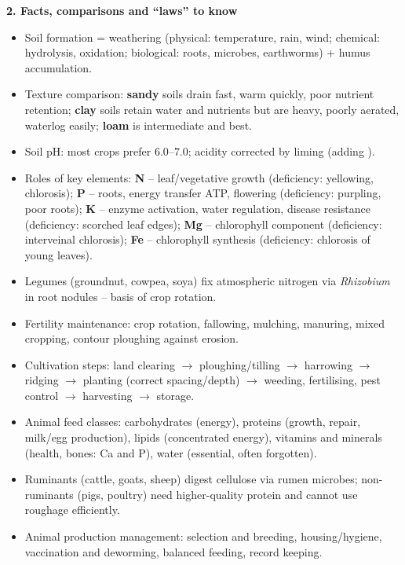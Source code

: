 \documentclass[11pt]{article}
\newcommand{\cle}[1]{{\popxbold\color{popdark}#1}}
\begin{document}
\begin{bilan}
\textbf{2. Facts, comparisons and ``laws'' to know}
\begin{itemize}
\item Soil formation = \cle{weathering} (physical: temperature, rain, wind; chemical: hydrolysis, oxidation; biological: roots, microbes, earthworms) + humus accumulation.
\item Texture comparison: \textbf{sandy} soils drain fast, warm quickly, poor nutrient retention; \textbf{clay} soils retain water and nutrients but are heavy, poorly aerated, waterlog easily; \textbf{loam} is intermediate and best.
\item Soil pH: most crops prefer $6.0$--$7.0$; acidity corrected by \cle{liming} (adding ).
\item Roles of key elements: \textbf{N} -- leaf/vegetative growth (deficiency: yellowing, chlorosis); \textbf{P} -- roots, energy transfer ATP, flowering (deficiency: purpling, poor roots); \textbf{K} -- enzyme activation, water regulation, disease resistance (deficiency: scorched leaf edges); \textbf{Mg} -- chlorophyll component (deficiency: interveinal chlorosis); \textbf{Fe} -- chlorophyll synthesis (deficiency: chlorosis of young leaves).
\item Legumes (groundnut, cowpea, soya) fix atmospheric nitrogen via \emph{Rhizobium} in root nodules -- basis of crop rotation.
\item Fertility maintenance: crop rotation, fallowing, mulching, manuring, mixed cropping, contour ploughing against erosion.
\item Cultivation steps: land clearing $\rightarrow$ ploughing/tilling $\rightarrow$ harrowing $\rightarrow$ ridging $\rightarrow$ planting (correct spacing/depth) $\rightarrow$ weeding, fertilising, pest control $\rightarrow$ harvesting $\rightarrow$ storage.
\item Animal feed classes: carbohydrates (energy), proteins (growth, repair, milk/egg production), lipids (concentrated energy), vitamins and minerals (health, bones: Ca and P), water (essential, often forgotten).
\item Ruminants (cattle, goats, sheep) digest cellulose via rumen microbes; non-ruminants (pigs, poultry) need higher-quality protein and cannot use roughage efficiently.
\item Animal production management: selection and breeding, housing/hygiene, vaccination and deworming, balanced feeding, record keeping.
\end{itemize}


\end{bilan}
\end{document}
